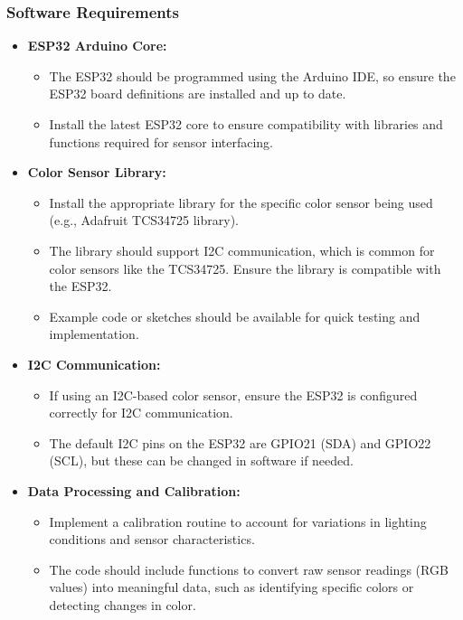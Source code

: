 \subsubsection*{Software Requirements}

\begin{itemize}
	\item \textbf{ESP32 Arduino Core:}
	\begin{itemize}
		\item The ESP32 should be programmed using the Arduino IDE, so ensure the ESP32 board definitions are installed and up to date.
		\item Install the latest ESP32 core to ensure compatibility with libraries and functions required for sensor interfacing.
	\end{itemize}
	
	\item \textbf{Color Sensor Library:}
	\begin{itemize}
		\item Install the appropriate library for the specific color sensor being used (e.g., Adafruit TCS34725 library).
		\item The library should support I2C communication, which is common for color sensors like the TCS34725. Ensure the library is compatible with the ESP32.
		\item Example code or sketches should be available for quick testing and implementation.
	\end{itemize}
	
	\item \textbf{I2C Communication:}
	\begin{itemize}
		\item If using an I2C-based color sensor, ensure the ESP32 is configured correctly for I2C communication.
		\item The default I2C pins on the ESP32 are GPIO21 (SDA) and GPIO22 (SCL), but these can be changed in software if needed.
	\end{itemize}
	
	\item \textbf{Data Processing and Calibration:}
	\begin{itemize}
		\item Implement a calibration routine to account for variations in lighting conditions and sensor characteristics.
		\item The code should include functions to convert raw sensor readings (RGB values) into meaningful data, such as identifying specific colors or detecting changes in color.
	\end{itemize}
	

\end{itemize}
